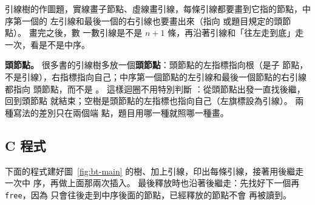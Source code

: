 \begin{examnote}
引線樹的作圖題，實線畫子節點、虛線畫引線，每條引線都要畫到它指的節點，中序第一個的
左引線和最後一個的右引線也要畫出來（指向 \NIL 或題目規定的頭節點）。 畫完之後，數
一數引線是不是 $n + 1$ 條，再沿著引線和「往左走到底」走一次，看是不是中序。
\end{examnote}

\textbf{頭節點。} 很多書的引線樹多放一個\textbf{頭節點}：頭節點的左指標指向根（是子
節點，不是引線），右指標指向自己；中序第一個節點的左引線和最後一個節點的右引線都指向
頭節點，而不是 \NIL。 這樣迴圈不用特別判斷 \NIL：從頭節點出發一直找後繼，回到頭節點
就結束；空樹是頭節點的左指標也指向自己（左旗標設為引線）。 兩種寫法的差別只在兩個端
點，題目用哪一種就照哪一種畫。

\subsection{C 程式}

下面的程式建好圖~\ref{fig:bt-main} 的樹、加上引線，印出每條引線，接著用後繼走一次中
序，再做上面那兩次插入。 最後釋放時也沿著後繼走：先找好下一個再
\texttt{free}，因為  只會往後走到中序後面的節點，已經釋放的節點不會
再被讀到。

